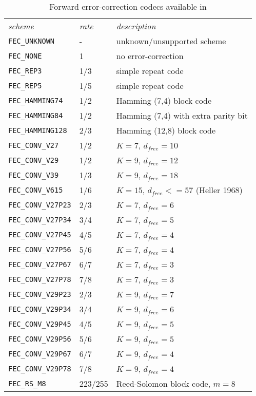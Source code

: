 \begin{table*}
\caption{Forward error-correction codecs available in \liquid}
\label{tab:fec:codecs}
\centering
{\small
\begin{tabular*}{0.75\textwidth}{l@{\extracolsep{\fill}}ll}
\toprule
{\it scheme} &
{\it rate} &
{\it description}\\\otoprule
%
{\tt FEC\_UNKNOWN}              & -         & unknown/unsupported scheme\\
{\tt FEC\_NONE}                 & 1         & no error-correction\\
{\tt FEC\_REP3}                 & 1/3       & simple repeat code\\
{\tt FEC\_REP5}                 & 1/5       & simple repeat code\\
{\tt FEC\_HAMMING74}            & 1/2       & Hamming (7,4) block code\\
{\tt FEC\_HAMMING84}            & 1/2       & Hamming (7,4) with extra parity bit\\
{\tt FEC\_HAMMING128}           & 2/3       & Hamming (12,8) block code\\\midrule
%
{\tt FEC\_CONV\_V27}            & 1/2       & $K=7$, $d_{free}=10$\\
{\tt FEC\_CONV\_V29}            & 1/2       & $K=9$, $d_{free}=12$\\
{\tt FEC\_CONV\_V39}            & 1/3       & $K=9$, $d_{free}=18$\\
{\tt FEC\_CONV\_V615}           & 1/6       & $K=15$, $d_{free}<=57$ (Heller 1968)\\\midrule
%
{\tt FEC\_CONV\_V27P23}         & 2/3       & $K=7$, $d_{free}=6$\\
{\tt FEC\_CONV\_V27P34}         & 3/4       & $K=7$, $d_{free}=5$\\
{\tt FEC\_CONV\_V27P45}         & 4/5       & $K=7$, $d_{free}=4$\\
{\tt FEC\_CONV\_V27P56}         & 5/6       & $K=7$, $d_{free}=4$\\
{\tt FEC\_CONV\_V27P67}         & 6/7       & $K=7$, $d_{free}=3$\\
{\tt FEC\_CONV\_V27P78}         & 7/8       & $K=7$, $d_{free}=3$\\\midrule
%
{\tt FEC\_CONV\_V29P23}         & 2/3       & $K=9$, $d_{free}=7$\\
{\tt FEC\_CONV\_V29P34}         & 3/4       & $K=9$, $d_{free}=6$\\
{\tt FEC\_CONV\_V29P45}         & 4/5       & $K=9$, $d_{free}=5$\\
{\tt FEC\_CONV\_V29P56}         & 5/6       & $K=9$, $d_{free}=5$\\
{\tt FEC\_CONV\_V29P67}         & 6/7       & $K=9$, $d_{free}=4$\\
{\tt FEC\_CONV\_V29P78}         & 7/8       & $K=9$, $d_{free}=4$\\\midrule
% 
{\tt FEC\_RS\_M8}               & 223/255   & Reed-Solomon block code, $m=8$\\\bottomrule



\end{tabular*}}
\end{table*}

